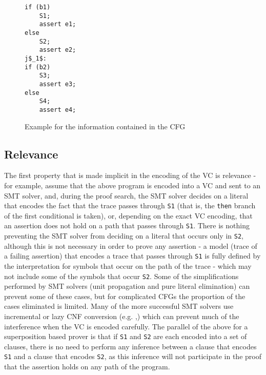 \begin{figure}
\begin{lstlisting}
if (b1)
	S1;
	assert e1;
else
	S2;
	assert e2;
j$_1$:
if (b2)
	S3;
	assert e3;
else
	S4;
	assert e4;
\end{lstlisting}
\caption{Example for the information contained in the CFG}
\label{snippet_1.1}
\end{figure}

\subsection*{Relevance}
The first property that is made implicit in the encoding of the VC is relevance - for example, assume that the above program is encoded into a VC and sent to an SMT solver, and, during the proof search, the SMT solver decides on a literal that encodes the fact that the trace passes through \lstinline|S1| (that is, the \lstinline|then| branch of the first conditional is taken), or, depending on the exact VC encoding, that an assertion does not hold on a path that passes through \lstinline|S1|.
There is nothing preventing the SMT solver from deciding on a literal that occurs only in \lstinline|S2|, although this is not necessary in order to prove any assertion - a model (trace of a failing assertion) that encodes a trace that passes through \lstinline|S1| is fully defined by the interpretation for symbols that occur on the path of the trace - which may not include some of the symbols that occur  \lstinline|S2|.
Some of the simplifications performed by SMT solvers (unit propagation and pure literal elimination) can prevent some of these cases, but for complicated CFGs the proportion of the cases eliminated is limited.
Many of the more successful SMT solvers use incremental or lazy CNF conversion (e.g. \cite{DBLP:conf/cav/BarrettDS02},\cite{DBLP:journals/jacm/DetlefsNS05}) which can prevent much of the interference when the VC is encoded carefully.
The parallel of the above for a superposition based prover is that if \lstinline|S1| and \lstinline|S2| are each encoded into a set of clauses, there is no need to perform any inference between a clause that encodes \lstinline|S1| and a clause that encodes \lstinline|S2|,
as this inference will not participate in the proof that the assertion holds on any path of the program.

